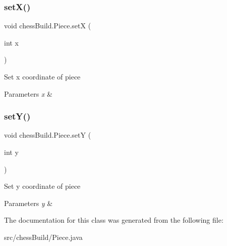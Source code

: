 \subsubsection{\texorpdfstring{set\+X()}{setX()}}
{\footnotesize\ttfamily void chess\+Build.\+Piece.\+setX (\begin{DoxyParamCaption}\item[{int}]{x }\end{DoxyParamCaption})}

Set x coordinate of piece 
\begin{DoxyParams}{Parameters}
{\em x} & \\
\hline
\end{DoxyParams}
\mbox{\label{classchess_build_1_1_piece_a3d591027929747d1d2436a702ef15e3d}} 
\subsubsection{\texorpdfstring{set\+Y()}{setY()}}
{\footnotesize\ttfamily void chess\+Build.\+Piece.\+setY (\begin{DoxyParamCaption}\item[{int}]{y }\end{DoxyParamCaption})}

Set y coordinate of piece 
\begin{DoxyParams}{Parameters}
{\em y} & \\
\hline
\end{DoxyParams}


The documentation for this class was generated from the following file\+:\begin{DoxyCompactItemize}
\item 
src/chess\+Build/Piece.\+java\end{DoxyCompactItemize}
